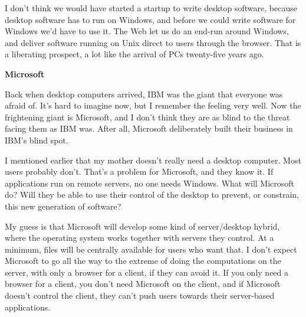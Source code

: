 \documentclass[12pt]{book}
\begin{document}
I don't think we would have started a startup to write desktop software,
because desktop software has to run on Windows, and before we could
write software for Windows we'd have to use it. The Web let us do an
end-run around Windows, and deliver software running on Unix direct to
users through the browser. That is a liberating prospect, a lot like the
arrival of PCs twenty-five years ago.

\textbf{Microsoft}

Back when desktop computers arrived, IBM was the giant that everyone was
afraid of. It's hard to imagine now, but I remember the feeling very
well. Now the frightening giant is Microsoft, and I don't think they are
as blind to the threat facing them as IBM was. After all, Microsoft
deliberately built their business in IBM's blind spot.

I mentioned earlier that my mother doesn't really need a desktop
computer. Most users probably don't. That's a problem for Microsoft, and
they know it. If applications run on remote servers, no one needs
Windows. What will Microsoft do? Will they be able to use their control
of the desktop to prevent, or constrain, this new generation of
software?

My guess is that Microsoft will develop some kind of server/desktop
hybrid, where the operating system works together with servers they
control. At a minimum, files will be centrally available for users who
want that. I don't expect Microsoft to go all the way to the extreme of
doing the computations on the server, with only a browser for a client,
if they can avoid it. If you only need a browser for a client, you don't
need Microsoft on the client, and if Microsoft doesn't control the
client, they can't push users towards their server-based applications.
\end{document}
